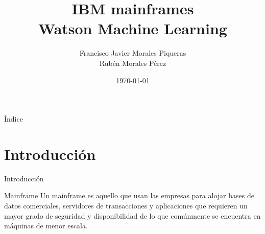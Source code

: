 \documentclass[compress]{beamer}
\title{IBM mainframes \\ Watson Machine Learning}
\author{Francisco Javier Morales Piqueras \\ Rubén Morales Pérez}
\date{\today}
\begin{document}
\begin{frame}
\titlepage
\end{frame}
\begin{frame}{Índice}
	\hypertarget{index}{}
	\tableofcontents
\end{frame}

\section{Introducción}
\begin{frame}{Introducción}
	\begin{block}{Mainframe}
		Un mainframe es aquello que usan las empresas para alojar bases de datos comerciales, servidores de transacciones y aplicaciones que requieren un mayor grado de seguridad y disponibilidad de lo que comúnmente se encuentra en máquinas de menor escala.
	\end{block}


\end{frame}
\end{document}
